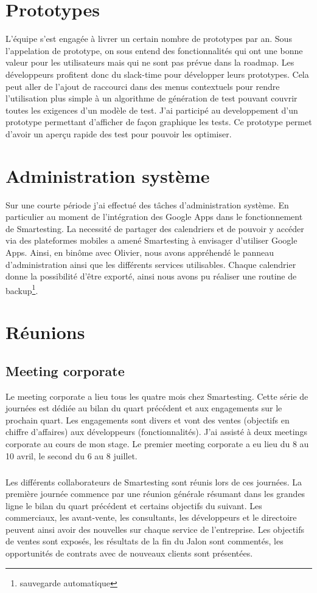 \section{Prototypes}
L'équipe s'est engagée à livrer un certain nombre de prototypes par an. Sous l'appelation de prototype, on sous entend des fonctionnalités qui ont une bonne valeur pour les utilisateurs mais qui ne sont pas prévue dans la roadmap. Les développeurs profitent donc du slack-time pour développer leurs prototypes. Cela peut aller de l'ajout de raccourci dans des menus contextuels pour rendre l'utilisation plus simple à un algorithme de génération de test pouvant couvrir toutes les exigences d'un modèle de test. J'ai participé au developpement d'un prototype permettant d'afficher de façon graphique les tests. Ce prototype permet d'avoir un aperçu rapide des test pour pouvoir les optimiser.
\section{Administration système}
Sur une courte période j'ai effectué des t\^aches d'administration système. En particulier au moment de l'intégration des Google Apps dans le fonctionnement de Smartesting. La necessité de partager des calendriers et de pouvoir y accéder via des plateformes mobiles a amené Smartesting à envisager d'utiliser Google Apps. Ainsi, en binôme avec Olivier, nous avons appréhendé le panneau d'administration ainsi que les différents services utilisables. Chaque calendrier donne la possibilité d'être exporté, ainsi nous avons pu réaliser une routine de backup\footnote{sauvegarde automatique}.
\section{Réunions}
\subsection{Meeting corporate}
Le meeting corporate a lieu tous les quatre mois chez Smartesting. Cette série de journées est dédiée au bilan du quart précédent et aux engagements sur le prochain quart. Les engagements sont divers et vont des ventes (objectifs en chiffre d'affaires) aux développeurs (fonctionnalités). J'ai assisté à deux meetings corporate au cours de mon stage. Le premier meeting corporate a eu lieu du 8 au 10 avril, le second du 6 au 8 juillet.
\subparagraph*{}
Les différents collaborateurs de Smartesting sont réunis lors de ces journées. La première journée commence par une réunion générale résumant dans les grandes ligne le bilan du quart précédent et certains objectifs du suivant. Les commerciaux, les avant-vente, les consultants, les développeurs et le directoire peuvent ainsi avoir des nouvelles sur chaque service de l'entreprise. Les objectifs de ventes sont exposés, les résultats de la fin du Jalon sont commentés, les opportunités de contrats avec de nouveaux clients sont présentées.
